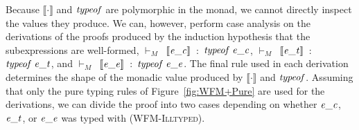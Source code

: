 Because \ensuremath{\llbracket \cdot \rrbracket} and \ensuremath{\Varid{typeof}} are polymorphic in the monad, we cannot
directly inspect the values they produce. We can, however, perform
case analysis on the derivations of the proofs produced by the
induction hypothesis that the subexpressions are well-formed,
$\vdash_M$~\ensuremath{\llbracket \Varid{e\char95 c}\rrbracket}~:~\ensuremath{\Varid{typeof}\;\Varid{e\char95 c}},
$\vdash_M$~\ensuremath{\llbracket \Varid{e\char95 t}\rrbracket}~:~\ensuremath{\Varid{typeof}\;\Varid{e\char95 t}}, and
$\vdash_M$~\ensuremath{\llbracket \Varid{e\char95 e}\rrbracket}~:~\ensuremath{\Varid{typeof}\;\Varid{e\char95 e}}. The final rule used in each derivation determines the shape of
the monadic value produced by \ensuremath{\llbracket \cdot \rrbracket} and \ensuremath{\Varid{typeof}}.
Assuming that only the pure typing rules of Figure~\ref{fig:WFM+Pure}
are used for the derivations, we can divide the proof into
two cases depending on whether \ensuremath{\Varid{e\char95 c}}, \ensuremath{\Varid{e\char95 t}}, or \ensuremath{\Varid{e\char95 e}} was typed with \textsc{(WFM-Illtyped)}.
